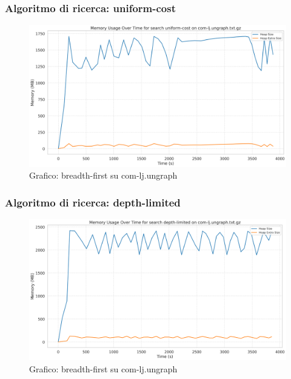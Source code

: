 \documentclass{article}
\begin{document}
\subsubsection{Algoritmo di ricerca: uniform-cost}
\begin{figure}[h]\centering
\includegraphics[width=\textwidth]{../plots/com-lj.ungraph_uniform-cost.png}
\caption{Grafico: breadth-first su com-lj.ungraph}
\end{figure}
\subsubsection{Algoritmo di ricerca: depth-limited}
\begin{figure}[h]\centering
\includegraphics[width=\textwidth]{../plots/com-lj.ungraph_depth-limited.png}
\caption{Grafico: breadth-first su com-lj.ungraph}
\end{figure}
\end{document}
